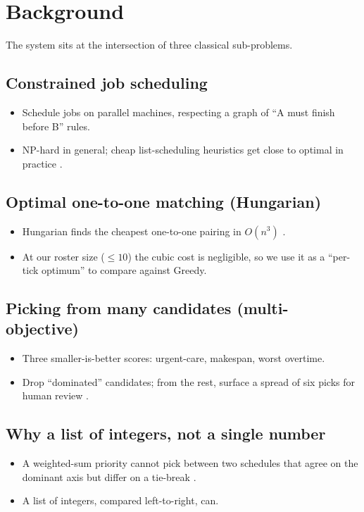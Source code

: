 \section{Background}
\label{sec:background}

The system sits at the intersection of three classical sub-problems.

\subsection{Constrained job scheduling}

\begin{itemize}
  \item Schedule jobs on parallel machines, respecting a graph of
        ``A must finish before B'' rules.
  \item NP-hard in general; cheap list-scheduling heuristics get
        close to optimal in practice \citep{graham1969bounds, clrs}.
\end{itemize}

\subsection{Optimal one-to-one matching (Hungarian)}

\begin{itemize}
  \item Hungarian finds the cheapest
        one-to-one pairing in $O(n^3)$
        \citep{jonker1987shortest}.
  \item At our roster size ($\leq 10$) the cubic cost is
        negligible, so we use it as a ``per-tick optimum'' to
        compare against Greedy.
\end{itemize}

\subsection{Picking from many candidates (multi-objective)}

\begin{itemize}
  \item Three smaller-is-better scores:
        urgent-care, makespan, worst overtime.
  \item Drop ``dominated'' candidates; from the rest, surface a
        spread of six picks for human review
        \citep{deb2002nsga, ehrgott2005multicriteria}.
\end{itemize}

\subsection{Why a list of integers, not a single number}

\begin{itemize}
  \item A weighted-sum priority cannot pick between two schedules
        that agree on the dominant axis but differ on a tie-break
        \citep{esi2005}.
  \item A list of integers, compared left-to-right, can.
\end{itemize}
